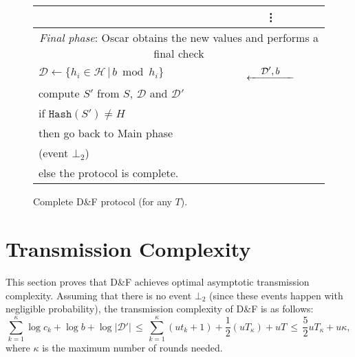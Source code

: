 \documentclass[twoside,envcountsame,runningheads]{llncs}
\newcommand{\Set}{\mathcal{H}}
\newcommand{\SetD}{\mathcal{D}}
\newcommand{\df}{D\&F\xspace}
\newcommand{\Hash}{\ensuremath{\mathtt{Hash}}}
\newcommand{\Lflow}[1]{\stackrel{\displaystyle #1}{\hbox to 5em{\leftarrowfill}}}
\newcommand{\apref}[1]{Appendix~\ref{#1}}
\newcommand{\apref}[1]{the full version~\cite{X:ABBMNR13}}
\begin{document}
\begin{figure}[t]
\begin{tabular}{p{}cp{}}
 & \vdots & \\
\midrule
\multicolumn{3}{c}{\textit{Final phase}: Oscar obtains the new values and performs a final check } \\
\midrule
$\SetD \gets \{ h_i \in \Set \,|\, b \bmod h_i \}$ & $\Lflow{\SetD',b}$  & \\
compute $S'$ from $S$, $\SetD$ and $\SetD'$ & & \\
if $\Hash(S') \neq H$ & & \\
\hspace{0.2cm} then go back to Main phase && \\
\hspace{0.4cm} (event $\bot_2$) & & \\
\hspace{0.2cm} else the protocol is complete. & & \\
\bottomrule
\end{tabular}\vspace{-0.25cm} %
\caption{Complete \df protocol (for any $T$).}
\label{fig:complete-df}
\end{figure}


\section{Transmission Complexity}
\label{sec:trans}

This section proves that \df achieves optimal asymptotic transmission complexity. %
%
% 
Assuming that there is no event $\bot_2$ (since these events happen with negligible probability), the transmission complexity of \df is as follows:
\[  \sum_{k=1}^\kappa \log c_k + \log b + \log |\SetD'|
 \,\leq\, \sum_{k=1}^\kappa (ut_k+1) + \frac{1}{2} (uT_\kappa) + u T
 \,\leq\, \frac{5}{2} u T_\kappa + u \kappa, \]
where $\kappa$ is the maximum number of rounds needed.
\end{document}
